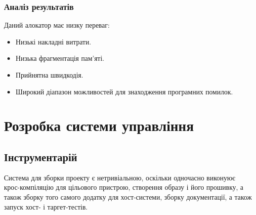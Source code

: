 \documentclass[oneside,14pt,a4paper,final]{myextreport}
\begin{document}
\subsection{Аналіз результатів}

Даний алокатор має низку переваг:
\begin{itemize}[nosep]
\item Низькі накладні витрати.
\item Низька фрагментація пам'яті.
\item Прийнятна швидкодія.
\item Широкий діапазон можливостей для знаходження програмних помилок.
\end{itemize}

\chapter{Розробка системи управління}

\section{Інструментарій}

Система для зборки проекту є нетривіальною, оскільки одночасно виконуює крос-компіляцію для цільового пристрою, створення образу і його прошивку, а також зборку того самого додатку для хост-системи, зборку документації, а також запуск хост- і таргет-тестів.
\end{document}

